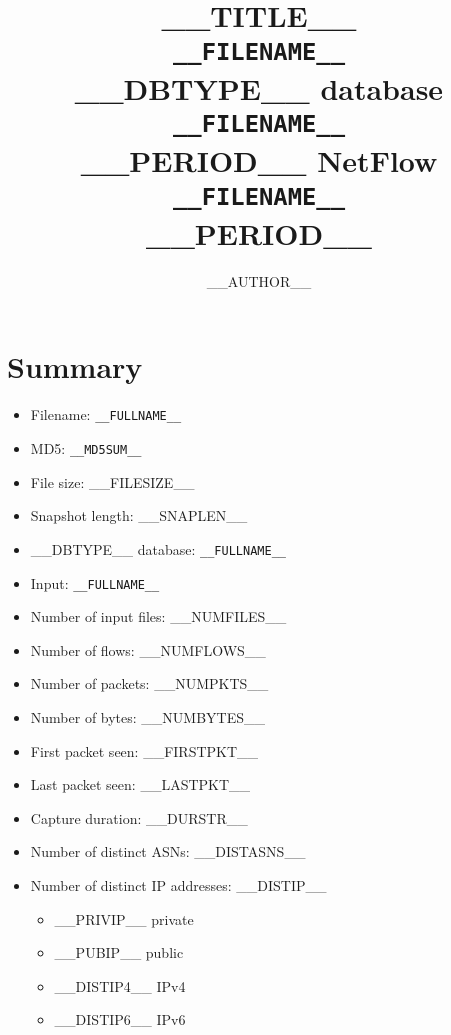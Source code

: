 \documentclass[10pt,a4paper,titlepage]{article}
\title{%
    \HRule{0.5pt}\\[0.2cm]
    \Huge\textbf{__TITLE__}\\[0.2cm]
    \Large\texttt{__FILENAME__}\\
    \Large __DBTYPE__ database\\
    \texttt{__FILENAME__}\\[0.2cm]
    \large __PERIOD__
    \Large NetFlow\\
    \texttt{__FILENAME__}\\[0.2cm]
    \large __PERIOD__
    \HRule{2pt}\\[3.0cm]
}
\author{__AUTHOR__}
\let\stdsection\section
\renewcommand\section{\clearpage\stdsection}
\begin{document}


\maketitle

\tableofcontents


\section{Summary}
    \begin{itemize}
        \item Filename: {\tt __FULLNAME__}
        \item MD5: {\tt __MD5SUM__}
        \item File size: __FILESIZE__
        \item Snapshot length: __SNAPLEN__
        \item __DBTYPE__ database: {\tt __FULLNAME__}
        \item Input: {\tt __FULLNAME__}
        \item Number of input files: __NUMFILES__
        \item Number of flows: __NUMFLOWS__
        \item Number of packets: __NUMPKTS__
        \item Number of bytes: __NUMBYTES__
        \item First packet seen: __FIRSTPKT__
        \item Last packet seen: __LASTPKT__
        \item Capture duration: __DURSTR__
        \item Number of distinct ASNs: __DISTASNS__
        \item Number of distinct IP addresses: __DISTIP__
            \begin{itemize}
                \item __PRIVIP__ private
                \item __PUBIP__ public
                \item __DISTIP4__ IPv4
                \item __DISTIP6__ IPv6
            \end{itemize}
    \end{itemize}
\end{document}
